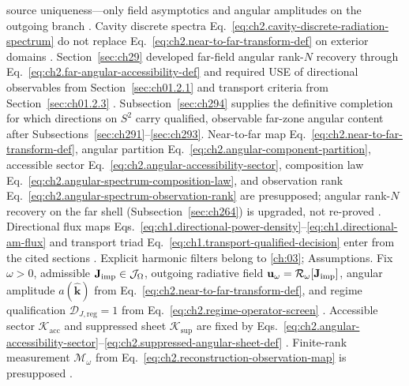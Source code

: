 source uniqueness---only field asymptotics and angular amplitudes on the outgoing branch
\cite{stratton1941}. Cavity discrete spectra Eq.~\eqref{eq:ch2.cavity-discrete-radiation-spectrum}
do not replace Eq.~\eqref{eq:ch2.near-to-far-transform-def} on exterior domains
\cite{jackson1999}.
Section~\ref{sec:ch29} developed far-field angular rank-$N$ recovery through
Eq.~\eqref{eq:ch2.far-angular-accessibility-def} and required USE of directional
observables from Section~\ref{sec:ch01.2.1} and transport criteria from
Section~\ref{sec:ch01.2.3} \cite{stratton1941}. Subsection~\ref{sec:ch294} supplies the definitive completion for which directions on \(S^{2}\) carry
qualified, observable far-zone angular content after Subsections~\ref{sec:ch291}--\ref{sec:ch293}.
Near-to-far map Eq.~\eqref{eq:ch2.near-to-far-transform-def}, angular partition
Eq.~\eqref{eq:ch2.angular-component-partition}, accessible sector
Eq.~\eqref{eq:ch2.angular-accessibility-sector}, composition law
Eq.~\eqref{eq:ch2.angular-spectrum-composition-law}, and observation rank
Eq.~\eqref{eq:ch2.angular-spectrum-observation-rank} are presupposed; angular rank-$N$ recovery on the far shell (Subsection~\ref{sec:ch264}) is upgraded, not re-proved
\cite{stratton1941}. Directional flux maps Eqs.~\eqref{eq:ch1.directional-power-density}--\eqref{eq:ch1.directional-am-flux}
and transport triad Eq.~\eqref{eq:ch1.transport-qualified-decision} enter from the cited sections
\cite{stratton1941}. Explicit harmonic filters belong to \ref{ch:03};
Assumptions. Fix \(\omega>0\), admissible \(\mathbf{J}_{\mathrm{imp}}\in\mathcal{J}_\Omega\), outgoing radiative field
\(\mathbf{u}_\omega=\mathcal{R}_\omega[\mathbf{J}_{\mathrm{imp}}]\), angular amplitude \(a(\widehat{\mathbf{k}})\) from
Eq.~\eqref{eq:ch2.near-to-far-transform-def}, and regime qualification
\(\mathcal{D}_{J,\mathrm{reg}}=1\) from Eq.~\eqref{eq:ch2.regime-operator-screen}
\cite{stratton1941}. Accessible sector \(\mathcal{K}_{\mathrm{acc}}\) and
suppressed sheet \(\mathcal{K}_{\mathrm{sup}}\) are fixed by
Eqs.~\eqref{eq:ch2.angular-accessibility-sector}--\eqref{eq:ch2.suppressed-angular-sheet-def}
\cite{stratton1941}. Finite-rank measurement \(\mathcal{M}_\omega\) from
Eq.~\eqref{eq:ch2.reconstruction-observation-map} is presupposed \cite{harrington2001}.
